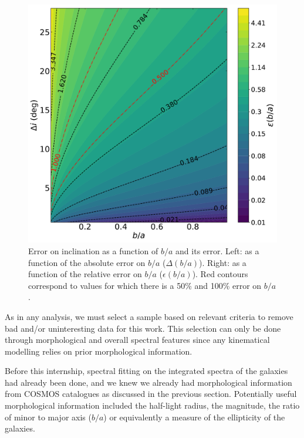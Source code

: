 \begin{figure}[H]
\begin{minipage}[c]{0.49\linewidth}
		\includegraphics[width=\linewidth]{../Plots/RelError_on_inc_versus_b_a.pdf}
	\end{minipage}
	\caption[Error on inclination as a function of $b/a$ and its error.]{Error on inclination as a function of $b/a$ and its error. Left: as a function of the absolute error on $b/a$ ($\Delta (b/a)$). Right: as a function of the relative error on $b/a$ ($\epsilon ( b/a)$). Red contours correspond to values for which there is a 50\% and 100\% error on $b/a$.}
	\label{fig:erreur_inclinaison}
\end{figure}

As in any analysis, we must select a sample based on relevant criteria to remove bad and/or uninteresting data for this work. This selection can only be done through morphological and overall spectral features since any kinematical modelling relies on prior morphological information. 

Before this internship, spectral fitting on the integrated spectra of the galaxies had already been done, and we knew we already had morphological information from COSMOS catalogues as discussed in the previous section. Potentially useful morphological information included the half-light radius, the magnitude, the ratio of minor to major axis ($b/a$) or equivalently a measure of the ellipticity of the galaxies. 

